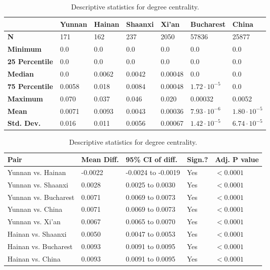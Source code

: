 \begin{table}[htbp]
	\begin{mdframed}
		\begin{tabular*}{\linewidth}{l|llllll}
			\hline
			\textbf{ } & \textbf{Yunnan} & \textbf{Hainan} & \textbf{Shaanxi} & \textbf{Xi'an} & \textbf{Bucharest} & \textbf{China}\\
			\hline
			\textbf{N} & 171 & 162 & 237 & 2050 & 57836 & 25877\\
			\textbf{Minimum} & 0.0 & 0.0 & 0.0 & 0.0 & 0.0 & 0.0\\
			\textbf{25 Percentile} & 0.0 & 0.0 & 0.0 & 0.0 & 0.0 & 0.0\\
			\textbf{Median} & 0.0 & 0.0062 & 0.0042 & 0.00048 & 0.0 & 0.0\\
			\textbf{75 Percentile} & 0.0058 & 0.018 & 0.0084 & 0.00048 & $1.72\cdot 10^{-5}$ & 0.0\\
			\textbf{Maximum} & 0.070 & 0.037 & 0.046 & 0.020 & 0.00032 & 0.0052\\
			\textbf{Mean} & 0.0071 & 0.0093 & 0.0043 & 0.00036 & $7.93\cdot 10^{-6}$ & $1.80\cdot 10^{-5}$\\
			\textbf{Std. Dev.} & 0.016 & 0.011 & 0.0056 & 0.00067 & $1.42\cdot 10^{-5}$ & $6.74\cdot 10^{-5}$\\
			\hline
		\end{tabular*}
		\caption{Descriptive statistics for degree centrality.}
		\label{tab:degree_centrality_desc}
		\vskip 10pt
		\small
		\begin{tabular*}{\linewidth}{l|llll}
			\hline
			\textbf{Pair} & \textbf{Mean Diff.} & \textbf{95\% CI of diff.} & \textbf{Sign.?} & \textbf{Adj. P value}\\
			\hline
			Yunnan vs. Hainan & -0.0022 & -0.0024 to -0.0019 & Yes & $<0.0001$\\
			Yunnan vs. Shaanxi & 0.0028 & 0.0025 to 0.0030 & Yes & $<0.0001$\\
			Yunnan vs. Bucharest & 0.0071 & 0.0069 to 0.0073 & Yes & $<0.0001$\\
			Yunnan vs. China & 0.0071 & 0.0069 to 0.0073 & Yes & $<0.0001$\\
			Yunnan vs. Xi'an & 0.0067 & 0.0065 to 0.0070 & Yes & $<0.0001$\\
			Hainan vs. Shaanxi & 0.0050 & 0.0047 to 0.0053 & Yes & $<0.0001$\\
			Hainan vs. Bucharest & 0.0093 & 0.0091 to 0.0095 & Yes & $<0.0001$\\
			Hainan vs. China & 0.0093 & 0.0091 to 0.0095 & Yes & $<0.0001$\\

\end{tabular*}
\end{mdframed}
\end{table}
